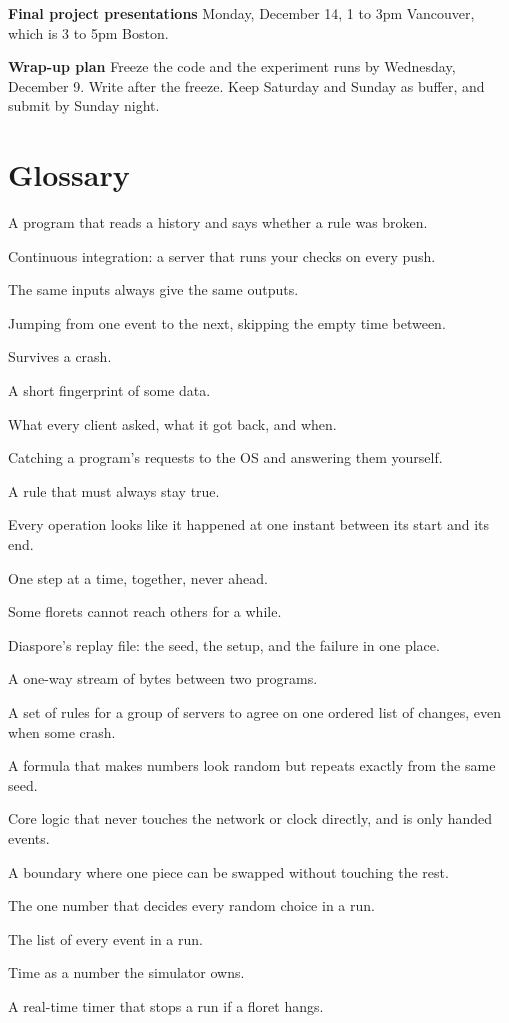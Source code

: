 \documentclass[11pt,letterpaper]{article}
\newcommand{\lbl}[1]{\textbf{#1}\enspace}
\begin{document}
\lbl{Final project presentations} Monday, December 14, 1 to 3pm Vancouver, which is 3 to 5pm Boston.

\lbl{Wrap-up plan} Freeze the code and the experiment runs by Wednesday, December 9. Write after the freeze. Keep Saturday and Sunday as buffer, and submit by Sunday night.

\section{Glossary}

\begin{description}[leftmargin=0pt, itemsep=3pt, parsep=0pt]
  \item[Checker] A program that reads a history and says whether a rule was broken.
  \item[CI] Continuous integration: a server that runs your checks on every push.
  \item[Determinism] The same inputs always give the same outputs.
  \item[Discrete-event simulation] Jumping from one event to the next, skipping the empty time between.
  \item[Durable] Survives a crash.
  \item[Hash] A short fingerprint of some data.
  \item[History] What every client asked, what it got back, and when.
  \item[Interception] Catching a program's requests to the OS and answering them yourself.
  \item[Invariant] A rule that must always stay true.
  \item[Linearizability] Every operation looks like it happened at one instant between its start and its end.
  \item[Lockstep] One step at a time, together, never ahead.
  \item[Network partition] Some florets cannot reach others for a while.
  \item[.pappus] Diaspore's replay file: the seed, the setup, and the failure in one place.
  \item[Pipe] A one-way stream of bytes between two programs.
  \item[Raft] A set of rules for a group of servers to agree on one ordered list of changes, even when some crash.
  \item[PRNG] A formula that makes numbers look random but repeats exactly from the same seed.
  \item[Sans-I/O] Core logic that never touches the network or clock directly, and is only handed events.
  \item[Seam] A boundary where one piece can be swapped without touching the rest.
  \item[Seed] The one number that decides every random choice in a run.
  \item[Trace] The list of every event in a run.
  \item[Virtual time] Time as a number the simulator owns.
  \item[Watchdog] A real-time timer that stops a run if a floret hangs.
\end{description}
\end{document}
